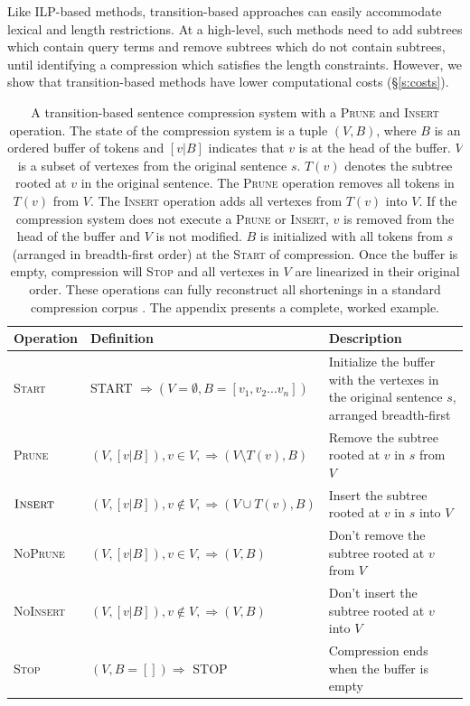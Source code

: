 \documentclass[11pt,a4paper]{article}
\begin{document}
Like ILP-based methods, transition-based approaches can easily accommodate lexical and length restrictions. At a high-level, such methods need to add subtrees which contain query terms and remove subtrees which do not contain subtrees, until identifying a compression which satisfies the length constraints. However, we show that transition-based methods have lower computational costs (\S\ref{s:costs}).

\begin{table}[]
\centering
\begin{tabular}{llp{70mm}}
\textbf{Operation} &             \textbf{Definition}                                                    &      \textbf{Description}    \\ \hline
\textsc{Start}      & START $\Rightarrow ( V=\emptyset,  B=[v_1, v_2 ... v_n])$ & Initialize the buffer with the vertexes in the original sentence $s$, arranged breadth-first \\ \hline
\textsc{Prune}              & $(V, [v|B]), v \in V,  \Rightarrow (V \setminus  T(v), B)$ & Remove the subtree rooted at $v$ in $s$ from $V$ \\  
$\textsc{Insert}$             & $(V, [v|B]), v \notin V, \Rightarrow (V \cup T(v), B)$ & Insert the subtree rooted at $v$ in $s$ into $V$  \\ \hline
\textsc{NoPrune}           & $(V, [v|B]), v \in V, \Rightarrow (V, B)$ & Don't remove the subtree rooted at $v$ from $V$  \\ 
\textsc{NoInsert}          &       $(V, [v|B]), v \notin V, \Rightarrow (V, B)$ &   Don't insert the subtree rooted at $v$ into $V$    \\ \hline
\textsc{Stop}             & $ (V, B=[]) \Rightarrow$ STOP & Compression ends when the buffer is empty \\                                               
\end{tabular}
\caption{A transition-based sentence compression system with a \textsc{Prune} and \textsc{Insert} operation. The state of the compression system is a tuple $(V, B)$, where $B$ is an ordered buffer of tokens and $[v|B]$ indicates that $v$ is at the head of the buffer. $V$ is a subset of vertexes from the original sentence $s$. $T(v)$ denotes the subtree rooted at $v$ in the original sentence. The \textsc{Prune} operation removes all tokens in $T(v)$ from $V$. The \textsc{Insert} operation adds all vertexes from $T(v)$ into $V$. If the compression system does not execute a \textsc{Prune} or \textsc{Insert}, $v$ is removed from the head of the buffer and $V$ is not modified. $B$ is initialized with all tokens from $s$ (arranged in breadth-first order) at the \textsc{Start} of compression. Once the buffer is empty, compression will \textsc{Stop} and all vertexes in $V$ are linearized in their original order. These operations can fully reconstruct all shortenings in a standard compression corpus \cite{filippova2013overcoming}. The appendix presents a complete, worked example.}
\label{t:ops}
\end{table}
\end{document}

